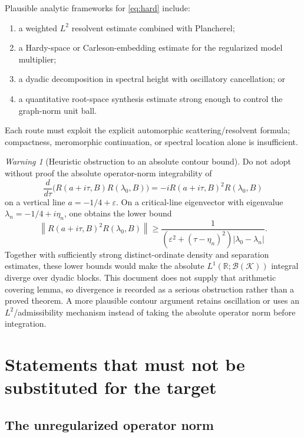 \documentclass[11pt]{amsart}
\theoremstyle{definition}
\theoremstyle{remark}
\newtheorem{warning}[theorem]{Warning}
\newcommand{\R}{\mathbb R}
\newcommand{\Bcal}{\mathcal B}
\newcommand{\Kcal}{\mathcal K}
\newcommand{\norm}[1]{\left\lVert #1\right\rVert}
\newcommand{\abs}[1]{\left\lvert #1\right\rvert}
\newcommand{\eps}{\varepsilon}
\begin{document}
Plausible analytic frameworks for \eqref{eq:hard} include:
\begin{enumerate}[label=(R\arabic*)]
 \item a weighted $L^{2}$ resolvent estimate combined with Plancherel;
 \item a Hardy-space or Carleson-embedding estimate for the regularized model
       multiplier;
 \item a dyadic decomposition in spectral height with oscillatory
       cancellation; or
 \item a quantitative root-space synthesis estimate strong enough to control
       the graph-norm unit ball.
\end{enumerate}
Each route must exploit the explicit automorphic scattering/resolvent formula;
compactness, meromorphic continuation, or spectral location alone is
insufficient.

\begin{warning}[Heuristic obstruction to an absolute contour bound]
\label{warn:L1}
Do not adopt without proof the absolute operator-norm integrability of
\[
 \frac{d}{d\tau}
 \bigl(R(a+i\tau,B)R(\lambda_{0},B)\bigr)
 =
 -iR(a+i\tau,B)^{2}R(\lambda_{0},B)
\]
on a vertical line $a=-1/4+\eps$.  On a critical-line eigenvector with
eigenvalue $\lambda_n=-1/4+i\eta_n$, one obtains the lower bound
\[
 \norm{R(a+i\tau,B)^2R(\lambda_0,B)}
 \geq
 \frac{1}
 {(\eps^2+(\tau-\eta_n)^2)\abs{\lambda_0-\lambda_n}}.
\]
Together with sufficiently strong distinct-ordinate density and separation
estimates, these lower bounds would make the absolute
$L^{1}(\R;\Bcal(\Kcal))$ integral diverge over dyadic blocks.  This document
does not supply that arithmetic covering lemma, so divergence is recorded as
a serious obstruction rather than a proved theorem.  A more plausible contour
argument retains oscillation or uses an $L^{2}$/admissibility mechanism instead
of taking the absolute operator norm before integration.
\end{warning}

\section{Statements that must not be substituted for the target}
\label{sec:not-target}

\subsection{The unregularized operator norm}
\end{document}

